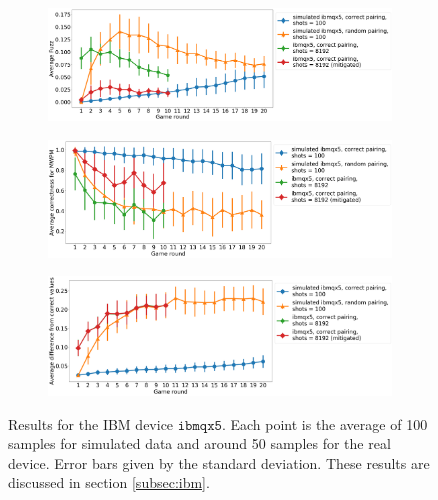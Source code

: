 \documentclass[aps,prl,twocolumn,showpacs,preprintnumbers]{revtex4-1}
\begin{document}
\begin{figure}
    \centering
    \begin{subfigure}[b]{\textwidth}
        \includegraphics[width=\textwidth]{figures/ibmqx5_fuzz.png}
    \end{subfigure}
    \begin{subfigure}[b]{\textwidth}
        \includegraphics[width=\textwidth]{figures/ibmqx5_mwpm.png}
    \end{subfigure}
    \begin{subfigure}[b]{\textwidth}
        \includegraphics[width=\textwidth]{figures/ibmqx5_diff.png}
    \end{subfigure}
    \caption{Results for the IBM device $\mathtt{ibmqx5}$. Each point is the average of 100 samples for simulated data and around 50 samples for the real device. Error bars given by the standard deviation. These results are discussed in section \ref{subsec:ibm}.}\label{fig:ibmqx5}
\end{figure}
\pagebreak
\end{document}
